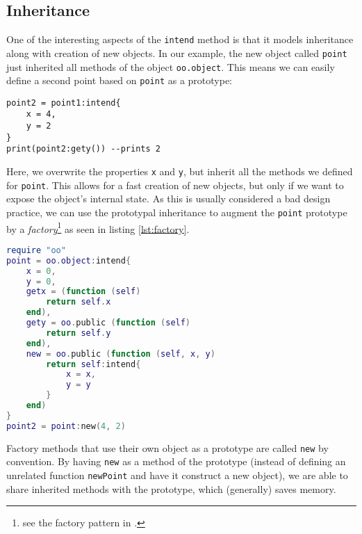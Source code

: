 \subsection{Inheritance}
\begin{comment}
TODO: Split this section into "inheritance" and "shortcuts"
Include self._super and self:super() in the "inheritance" part
Include oo.getter and oo.setter in the "shortcuts" part
\end{comment}


One of the interesting aspects of the \texttt{intend} method is that it models inheritance along with creation of new objects. In our example, the new object called \texttt{point} just inherited all methods of the object \texttt{oo.object}. This means we can easily define a second point based on \texttt{point} as a prototype:

\begin{lstlisting}[caption={Using \texttt{point1} as a protoype (continued from listing \ref{lst:point})}, label=lst:point2, name=lst:point]
point2 = point1:intend{
	x = 4,
	y = 2
}
print(point2:gety()) --prints 2
\end{lstlisting}

Here, we overwrite the properties \texttt{x} and \texttt{y}, but inherit all the methods we defined for \texttt{point}. This allows for a fast creation of new objects, but only if we want to expose the object's internal state. As this is usually considered a bad design practice, we can use the prototypal inheritance to augment the \texttt{point} prototype by a \emph{factory}\footnote{see the factory pattern in \cite{GOF}.} as seen in listing \ref{lst:factory}.

\begin{lstlisting}[language=lua, caption={Building a factory for points.}, label=lst:factory, name=lst:factory]
require "oo"
point = oo.object:intend{
	x = 0,
	y = 0,
	getx = (function (self)
		return self.x
	end),
	gety = oo.public (function (self)
		return self.y
	end),
	new = oo.public (function (self, x, y)
		return self:intend{
			x = x,
			y = y
		}
	end)
}
point2 = point:new(4, 2)
\end{lstlisting}

Factory methods that use their own object as a prototype are called \texttt{new} by convention. By having \texttt{new} as a method of the prototype (instead of defining an unrelated function \texttt{newPoint} and have it construct a new object), we are able to share inherited methods with the prototype, which (generally) saves memory.


